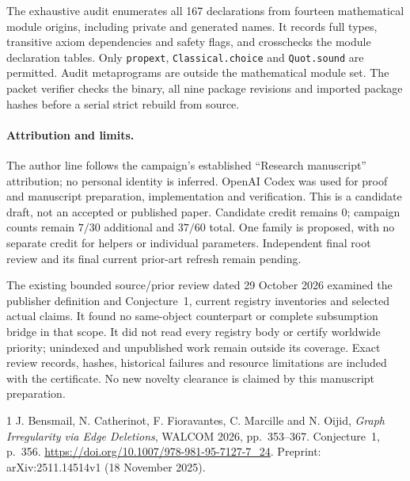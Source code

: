 \documentclass[11pt]{article}
\begin{document}
The exhaustive audit enumerates all 167 declarations from fourteen
mathematical module origins, including private and generated names. It
records full types, transitive axiom dependencies and safety flags, and
crosschecks the module declaration tables. Only \texttt{propext},
\texttt{Classical.choice} and \texttt{Quot.sound} are permitted.
Audit metaprograms are outside the mathematical module set. The packet
verifier checks the binary, all nine package revisions and imported
package hashes before a serial strict rebuild from source.

\paragraph{Attribution and limits.}
The author line follows the campaign's established ``Research manuscript''
attribution; no personal identity is inferred. OpenAI Codex was used for
proof and manuscript preparation, implementation and verification.
This is a candidate draft, not an accepted or published paper. Candidate
credit remains $0$; campaign counts remain $7/30$ additional and $37/60$
total. One family is proposed, with no separate credit for helpers or
individual parameters. Independent final root review and its final current
prior-art refresh remain pending.

The existing bounded source/prior review dated 29 October 2026 examined
the publisher definition and Conjecture~1, current registry inventories
and selected actual claims. It found no same-object counterpart or complete
subsumption bridge in that scope. It did not read every registry body or
certify worldwide priority; unindexed and unpublished work remain outside
its coverage. Exact review records, hashes, historical failures and resource
limitations are included with the certificate. No new novelty clearance
is claimed by this manuscript preparation.

\begin{thebibliography}{1}
 J. Bensmail, N. Catherinot, F. Fioravantes, C. Marcille
and N. Oijid, \emph{Graph Irregularity via Edge Deletions}, WALCOM 2026,
pp.~353--367. Conjecture~1, p.~356.
\url{https://doi.org/10.1007/978-981-95-7127-7_24}.
Preprint: arXiv:2511.14514v1 (18 November 2025).
\end{thebibliography}
\end{document}
